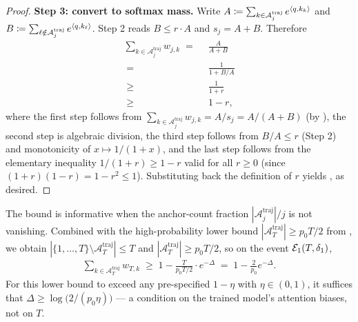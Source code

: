 \begin{proof}
\noindent\textbf{Step 3: convert to softmax mass.}
Write $A \coloneqq \sum_{k \in \mathcal A^{\mathrm{traj}}_j} e^{\left\langle q, k_k \right\rangle}$
and $B \coloneqq \sum_{\ell \notin \mathcal A^{\mathrm{traj}}_j} e^{\left\langle q, k_\ell \right\rangle}$.
Step 2 reads $B \le r \cdot A$ and $s_j = A + B$. Therefore
\begin{align*}
   \sum_{k \in \mathcal A^{\mathrm{traj}}_j} w_{j,k}
   \;=\; & ~ \frac{A}{A + B} \\
   \;=\; & ~ \frac{1}{1 + B/A} \\
   \;\ge\; & ~ \frac{1}{1 + r} \\
   \;\ge\; & ~ 1 - r,
\end{align*}
where the first step follows from
$\sum_{k \in \mathcal A^{\mathrm{traj}}_j} w_{j,k} = A/s_j = A/(A+B)$
(by ), the second step is algebraic
division, the third step follows from $B/A \le r$ (Step 2) and
monotonicity of $x \mapsto 1/(1+x)$, and the last step follows from the
elementary inequality $1/(1+r) \ge 1 - r$ valid for all $r \ge 0$ (since
$(1+r)(1-r) = 1 - r^2 \le 1$). Substituting back the definition of $r$
yields , as desired.
\end{proof}

\begin{remark}\label{rem:anchor_mass_lb_remark}
The bound  is informative when the
anchor-count fraction $|\mathcal A^{\mathrm{traj}}_j|/j$ is not vanishing.
Combined with the high-probability lower bound
$|\mathcal A^{\mathrm{traj}}_T| \ge p_0 T / 2$ from
, we obtain
$|\{1,\dots,T\}\setminus\mathcal A^{\mathrm{traj}}_T| \le T$ and
$|\mathcal A^{\mathrm{traj}}_T| \ge p_0 T / 2$, so on the event
$\mathcal{E}_1(T, \delta_1)$,
\begin{align*}
   \sum_{k \in \mathcal A^{\mathrm{traj}}_T} w_{T,k}
   \;\ge\; 1 - \frac{T}{p_0 T / 2} \cdot e^{-\Delta}
   \;=\; 1 - \frac{2}{p_0} e^{-\Delta}.
\end{align*}
For this lower bound to exceed any pre-specified $1 - \eta$ with
$\eta \in (0, 1)$, it suffices that
$\Delta \ge \log\!\big(2/(p_0 \eta)\big)$ --- a condition on the trained
model's attention biases, not on $T$.
\end{remark}
